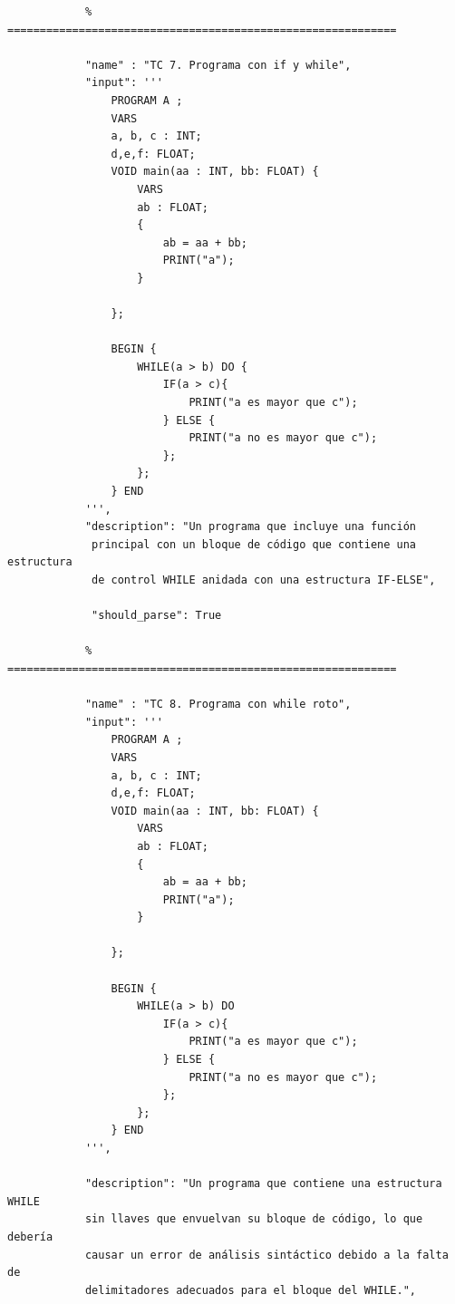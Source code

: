 \documentclass[12pt, letterpaper]{article}
\theoremstyle{definition}
\begin{document}
\begin{verbatim}
            % ============================================================
            
            "name" : "TC 7. Programa con if y while",
            "input": '''
                PROGRAM A ;
                VARS 
                a, b, c : INT;
                d,e,f: FLOAT;
                VOID main(aa : INT, bb: FLOAT) {                    
                    VARS
                    ab : FLOAT;
                    {                        
                        ab = aa + bb;
                        PRINT("a");
                    }
                    
                }; 
                                
                BEGIN { 
                    WHILE(a > b) DO {
                        IF(a > c){
                            PRINT("a es mayor que c");
                        } ELSE {
                            PRINT("a no es mayor que c");
                        };
                    };
                } END
            ''',
            "description": "Un programa que incluye una función
             principal con un bloque de código que contiene una estructura
             de control WHILE anidada con una estructura IF-ELSE",
           
             "should_parse": True
        
            % ============================================================

            "name" : "TC 8. Programa con while roto",
            "input": '''
                PROGRAM A ;
                VARS 
                a, b, c : INT;
                d,e,f: FLOAT;
                VOID main(aa : INT, bb: FLOAT) {                    
                    VARS
                    ab : FLOAT;
                    {                        
                        ab = aa + bb;
                        PRINT("a");
                    }
                    
                }; 
                                
                BEGIN { 
                    WHILE(a > b) DO 
                        IF(a > c){
                            PRINT("a es mayor que c");
                        } ELSE {
                            PRINT("a no es mayor que c");
                        };
                    };
                } END
            ''',
            
            "description": "Un programa que contiene una estructura WHILE
            sin llaves que envuelvan su bloque de código, lo que debería
            causar un error de análisis sintáctico debido a la falta de
            delimitadores adecuados para el bloque del WHILE.",
            

\end{verbatim}
\end{document}
